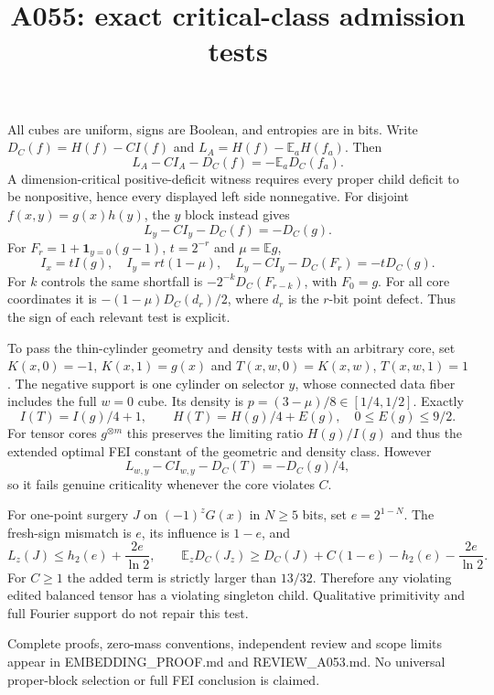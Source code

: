 \documentclass{article}
\begin{document}
\title{A055: exact critical-class admission tests}\maketitle
All cubes are uniform, signs are Boolean, and entropies are in bits.
Write $D_C(f)=H(f)-CI(f)$ and $L_A=H(f)-\mathbb E_aH(f_a)$.
Then
\[
 L_A-CI_A-D_C(f)=-\mathbb E_aD_C(f_a).
\]
A dimension-critical positive-deficit witness requires every proper child
deficit to be nonpositive, hence every displayed left side nonnegative.
For disjoint $f(x,y)=g(x)h(y)$, the $y$ block instead gives
\[
 L_y-CI_y-D_C(f)=-D_C(g).
\]
For $F_r=1+\mathbf1_{y=0}(g-1)$, $t=2^{-r}$ and $\mu=\mathbb Eg$,
\[
 I_x=tI(g),\quad I_y=rt(1-\mu),\quad
 L_y-CI_y-D_C(F_r)=-tD_C(g).
\]
For $k$ controls the same shortfall is $-2^{-k}D_C(F_{r-k})$, with $F_0=g$.
For all core coordinates it is $-(1-\mu)D_C(d_r)/2$, where $d_r$ is
the $r$-bit point defect. Thus the sign of each relevant test is explicit.

To pass the thin-cylinder geometry and density tests with an arbitrary
core, set $K(x,0)=-1$, $K(x,1)=g(x)$ and $T(x,w,0)=K(x,w)$,
$T(x,w,1)=1$. The negative support is one cylinder on selector $y$,
whose connected data fiber includes the full $w=0$ cube. Its density is
$p=(3-\mu)/8\in[1/4,1/2]$. Exactly
\[
 I(T)=I(g)/4+1,\qquad H(T)=H(g)/4+E(g),\quad 0\le E(g)\le9/2.
\]
For tensor cores $g^{\otimes m}$ this preserves the limiting ratio
$H(g)/I(g)$ and thus the extended optimal FEI constant of the geometric
and density class. However
\[
 L_{w,y}-CI_{w,y}-D_C(T)=-D_C(g)/4,
\]
so it fails genuine criticality whenever the core violates $C$.

For one-point surgery $J$ on $(-1)^zG(x)$ in $N\ge5$ bits, set
$e=2^{1-N}$. The fresh-sign mismatch is $e$, its influence is $1-e$,
and
\[
 L_z(J)\le h_2(e)+\frac{2e}{\ln2},\qquad
 \mathbb E_zD_C(J_z)\ge D_C(J)+C(1-e)-h_2(e)-\frac{2e}{\ln2}.
\]
For $C\ge1$ the added term is strictly larger than $13/32$. Therefore
any violating edited balanced tensor has a violating singleton child.
Qualitative primitivity and full Fourier support do not repair this test.

Complete proofs, zero-mass conventions, independent review and scope
limits appear in EMBEDDING\_PROOF.md and REVIEW\_A053.md. No universal
proper-block selection or full FEI conclusion is claimed.
\end{document}
